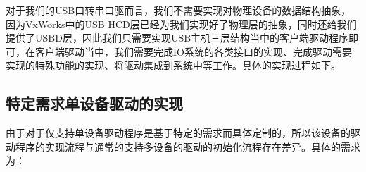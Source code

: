 对于我们的USB口转串口驱而言，我们不需要实现对物理设备的数据结构抽象，因为VxWorks中的USB HCD层已经为我们实现好了物理层的抽象，同时还给我们提供了USBD层，因此我们只需要实现USB主机三层结构当中的客户端驱动程序即可，在客户端驱动当中，我们需要完成IO系统的各类接口的实现、完成驱动需要实现的特殊功能的实现、将驱动集成到系统中等工作。具体的实现过程如下。


\subsection{特定需求单设备驱动的实现}

	由于对于仅支持单设备驱动程序是基于特定的需求而具体定制的，所以该设备的驱动程序的实现流程与通常的支持多设备的驱动的初始化流程存在差异。具体的需求为：\\
\\

